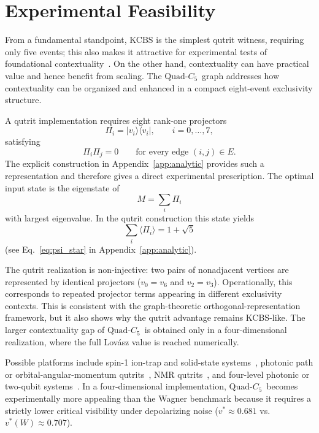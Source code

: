 \documentclass[aps,pra,twocolumn,superscriptaddress,longbibliography,floatfix]{revtex4-2}
\newcommand{\QC}{\ensuremath{\text{Quad-}C_5}}
\begin{document}
\section{Experimental Feasibility}
\label{sec:ExperimentalFeasibility}

From a fundamental standpoint, KCBS is the simplest qutrit witness, requiring
only five events; this also makes it attractive for experimental tests of
foundational contextuality~\cite{Klyachko2008,Hu2016}.
On the other hand, contextuality can have practical value and hence benefit
from scaling.
The \QC\ graph addresses how contextuality can be organized and enhanced in a
compact eight-event exclusivity structure.

A qutrit implementation requires eight rank-one projectors
\begin{equation}
  \Pi_i = |v_i\rangle\langle v_i|, \qquad i=0,\ldots,7,
\end{equation}
satisfying
\begin{equation}
  \Pi_i\Pi_j = 0 \qquad \text{for every edge }(i,j)\in E.
\end{equation}
The explicit construction in Appendix~\ref{app:analytic} provides such a
representation and therefore gives a direct experimental prescription.
The optimal input state is the eigenstate of
\begin{equation}
  M = \sum_i \Pi_i
\end{equation}
with largest eigenvalue. In the qutrit construction this state yields
\begin{equation}
  \sum_i \langle\Pi_i\rangle = 1+\sqrt{5}
\end{equation}
(see Eq.~\eqref{eq:psi_star} in Appendix~\ref{app:analytic}).

The qutrit realization is non-injective: two pairs of nonadjacent vertices
are represented by identical projectors ($v_0=v_6$ and $v_2=v_3$).
Operationally, this corresponds to repeated projector terms appearing in
different exclusivity contexts.
This is consistent with the graph-theoretic orthogonal-representation
framework, but it also shows why the qutrit advantage remains KCBS-like.
The larger contextuality gap of \QC\ is obtained only in a four-dimensional
realization, where the full Lov\'{a}sz value is reached numerically.

Possible platforms include spin-1 ion-trap and solid-state
systems~\cite{Klyachko2008,Kirchmair2009,Jerger2016}, photonic path or
orbital-angular-momentum
qutrits~\cite{Molina-Terriza2007,Hu2016,Lapkiewicz2011},
NMR qutrits~\cite{Budroni2022,Dogra2015}, and four-level photonic or
two-qubit systems~\cite{Amselem2009}.
In a four-dimensional implementation, \QC\ becomes experimentally more
appealing than the Wagner benchmark because it requires a strictly lower
critical visibility under depolarizing noise ($v^*\approx0.681$
vs.\ $v^*(W)\approx0.707$).
\end{document}
